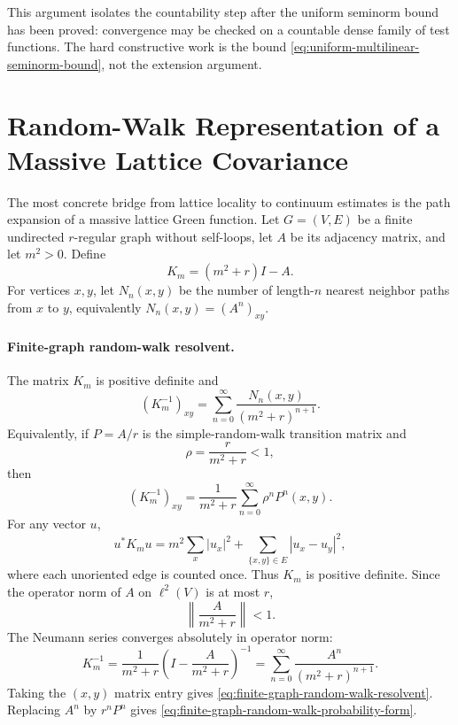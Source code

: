 This argument isolates the countability step after the uniform seminorm bound
has been proved: convergence may be checked on a countable dense family of
test functions.  The hard constructive work is the bound
\eqref{eq:uniform-multilinear-seminorm-bound}, not the extension argument.

\section{Random-Walk Representation of a Massive Lattice Covariance}

The most concrete bridge from lattice locality to continuum estimates is the
path expansion of a massive lattice Green function.  Let \(G=(V,E)\) be a
finite undirected \(r\)-regular graph without self-loops, let \(A\) be its
adjacency matrix, and let \(m^2>0\).  Define
\begin{equation}
  K_m=(m^2+r)I-A .
  \label{eq:massive-finite-graph-operator}
\end{equation}
For vertices \(x,y\), let \(N_n(x,y)\) be the number of length-\(n\) nearest
neighbor paths from \(x\) to \(y\), equivalently \(N_n(x,y)=(A^n)_{xy}\).

\paragraph{Finite-graph random-walk resolvent.}
The matrix \(K_m\) is positive definite and
\begin{equation}
  (K_m^{-1})_{xy}
  =
  \sum_{n=0}^{\infty}
  \frac{N_n(x,y)}{(m^2+r)^{n+1}} .
  \label{eq:finite-graph-random-walk-resolvent}
\end{equation}
Equivalently, if \(P=A/r\) is the simple-random-walk transition matrix and
\[
  \rho=\frac{r}{m^2+r}<1,
\]
then
\begin{equation}
  (K_m^{-1})_{xy}
  =
  \frac1{m^2+r}\sum_{n=0}^{\infty}\rho^n P^n(x,y).
  \label{eq:finite-graph-random-walk-probability-form}
\end{equation}
For any vector \(u\),
\begin{equation}
  u^*K_m u
  =
  m^2\sum_x |u_x|^2
  +
  \sum_{\{x,y\}\in E}|u_x-u_y|^2 ,
  \label{eq:finite-graph-positive-quadratic-form}
\end{equation}
where each unoriented edge is counted once.  Thus \(K_m\) is positive
definite.  Since the operator norm of \(A\) on \(\ell^2(V)\) is at most \(r\),
\[
  \left\|\frac{A}{m^2+r}\right\|<1 .
\]
The Neumann series converges absolutely in operator norm:
\[
  K_m^{-1}
  =
  \frac1{m^2+r}
  \left(I-\frac{A}{m^2+r}\right)^{-1}
  =
  \sum_{n=0}^{\infty}\frac{A^n}{(m^2+r)^{n+1}} .
  \]
Taking the \((x,y)\) matrix entry gives
\eqref{eq:finite-graph-random-walk-resolvent}.  Replacing \(A^n\) by
\(r^nP^n\) gives \eqref{eq:finite-graph-random-walk-probability-form}.

